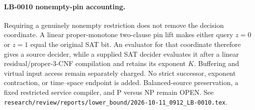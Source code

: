 \paragraph{LB-0010 nonempty-pin accounting.}
Requiring a genuinely nonempty restriction does not remove the decision
coordinate.  A linear proper-monotone two-clause pin lift makes either query
$z=0$ or $z=1$ equal the original SAT bit.  An evaluator for that coordinate
therefore gives a source decider, while a supplied SAT decider evaluates it
after a linear residual/proper-3-CNF compilation and retains its exponent
$K$.  Buffering and virtual input access remain separately charged.  No
strict successor, exponent contraction, or time--space endpoint is added.
Balanced-source preservation, a fixed restricted service compiler, and P
versus NP remain OPEN.  See
\texttt{research/review/reports/lower\_bound/2026-10-11\_0912\_LB-0010.tex}.
